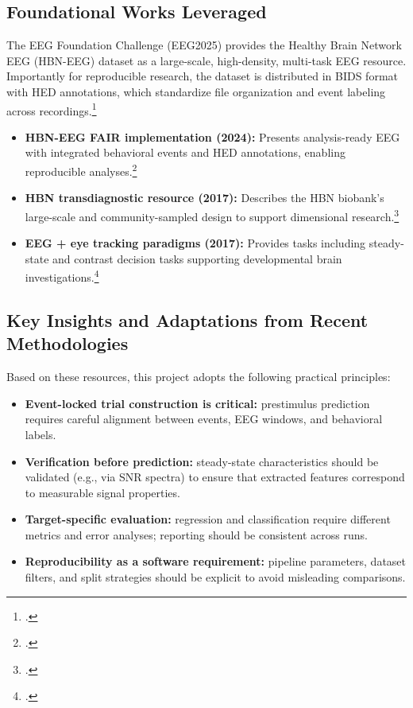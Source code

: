 \subsection{Foundational Works Leveraged}
\label{subsec:foundational-works}

The EEG Foundation Challenge (EEG2025) provides the Healthy Brain Network EEG (HBN-EEG) dataset as a large-scale, high-density, multi-task EEG resource. Importantly for reproducible research, the dataset is distributed in BIDS format with HED annotations, which standardize file organization and event labeling across recordings.\footnote{\cite{eeg_foundation_challenge_2025,hbn_fair_2024}.}

\begin{itemize}
    \item \textbf{HBN-EEG FAIR implementation (2024):} Presents analysis-ready EEG with integrated behavioral events and HED annotations, enabling reproducible analyses.\footnote{\cite{hbn_fair_2024}.}
    \item \textbf{HBN transdiagnostic resource (2017):} Describes the HBN biobank’s large-scale and community-sampled design to support dimensional research.\footnote{\cite{hbn_transdiagnostic_2017}.}
    \item \textbf{EEG + eye tracking paradigms (2017):} Provides tasks including steady-state and contrast decision tasks supporting developmental brain investigations.\footnote{\cite{eeg_eye_tracking_2017}.}
\end{itemize}

\subsection{Key Insights and Adaptations from Recent Methodologies}
\label{subsec:key-insights}

Based on these resources, this project adopts the following practical principles:
\begin{itemize}
    \item \textbf{Event-locked trial construction is critical:} prestimulus prediction requires careful alignment between events, EEG windows, and behavioral labels.
    \item \textbf{Verification before prediction:} steady-state characteristics should be validated (e.g., via SNR spectra) to ensure that extracted features correspond to measurable signal properties.
    \item \textbf{Target-specific evaluation:} regression and classification require different metrics and error analyses; reporting should be consistent across runs.
    \item \textbf{Reproducibility as a software requirement:} pipeline parameters, dataset filters, and split strategies should be explicit to avoid misleading comparisons.
\end{itemize}

